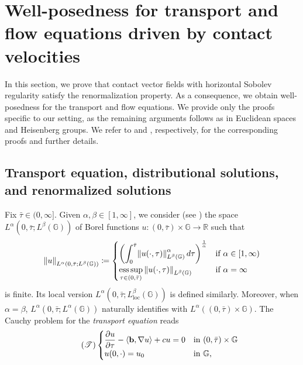 \documentclass[11pt]{amsart}
\newcommand{\rr}{\mathbb R}
\newcommand{\bb}{{\bf {b}}} %
\DeclarePairedDelimiter{\norm}{\lVert}{\rVert}
\theoremstyle{plain}
\theoremstyle{definition}
\theoremstyle{remark}
\numberwithin{equation}{section}
\begin{document}
\section{Well-posedness for transport and flow equations driven by contact velocities} \label{sec_well_posedness}
In this section, we prove that contact vector fields with horizontal Sobolev regularity satisfy the renormalization property. As a consequence, we obtain well-posedness for the transport and flow equations. We provide only the proofs specific to our setting, as the remaining arguments follows as in Euclidean spaces and Heisenberg groups. We refer to \cite{MR1022305} and \cite{dpl1}, respectively, for the corresponding proofs and further details.
\subsection{Transport equation, distributional solutions, and renormalized solutions}\label{sec_prelitranspo}
Fix $\bar\tau\in (0,\infty]$. Given $\alpha,\beta\in [1,\infty]$, we consider (see \cite{MR3726909}) the space $L^\alpha\left(0,\bar\tau;L^\beta(\mathbb{G})\right)$ of Borel functions $u : (0,\bar{\tau}) \times \mathbb{G} \to \rr$ such that 
\begin{equation*}
\norm*{u}_{L^\alpha(0,\bar{\tau};L^\beta(\mathbb{G}))} \coloneqq \begin{cases}
\displaystyle\left(\int_0^{\bar{\tau}} \norm*{u(\cdot,\tau)}_{L^\beta(\mathbb{G})}^\alpha \,d\tau\right)^{\frac{1}{\alpha}} & \text{if $\alpha \in [1,\infty)$}\\
\mathop{\mathrm{ess\,sup}}\limits_{\tau \in (0,\bar{\tau})} \, \norm*{u(\cdot,\tau)}_{L^\beta(\mathbb{G})} & \text{if $\alpha=\infty$}
\end{cases}
\end{equation*}
is finite. Its local version $L^\alpha\left(0,\bar{\tau};L^\beta_{\mathrm{loc}}(\mathbb{G})\right)$ is defined similarly. Moreover, when $\alpha=\beta$, $L^\alpha\left(0,\bar{\tau};L^\alpha(\mathbb{G})\right)$ naturally identifies with $L^\alpha\left((0,\bar{\tau})\times\mathbb{G}\right)$.
The Cauchy problem for the \emph{transport equation} reads
\begin{equation} \label{eq_transport_equation}\tag{$\mathscr T$}
\begin{cases}
\displaystyle{\frac{\partial u}{\partial \tau} - \left\langle \bb,\nabla u \right\rangle + cu = 0} & \text{in $(0,\bar{\tau}) \times \mathbb{G}$}\\
u(0,\cdot)=u_0 & \text{in $\mathbb{G}$,}
\end{cases}
\end{equation}
\end{document}

